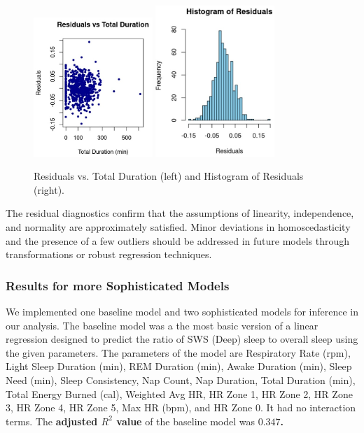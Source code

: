 \documentclass{article}
\begin{document}
\begin{figure}[h!]
  \centering
  \includegraphics[width=0.4\textwidth]{images/residuals_vs_duration.png}
  \includegraphics[width=0.4\textwidth]{images/histogram_residuals.png}
  \caption{Residuals vs. Total Duration (left) and Histogram of Residuals (right).}
  \label{fig:residuals-duration}
  \label{fig:hist-residuals}
\end{figure}

The residual diagnostics confirm that the assumptions of linearity, independence, and normality are approximately satisfied. Minor deviations in homoscedasticity and the presence of a few outliers should be addressed in future models through transformations or robust regression techniques.

\subsubsection{ \hspace{0.5em} Results for more Sophisticated Models}

We implemented one baseline model and two sophisticated models for inference in our analysis. The baseline model was a the most basic version of a linear regression designed to predict the ratio of SWS (Deep) sleep to overall sleep using the given parameters. The parameters of the model are Respiratory Rate (rpm), Light Sleep Duration (min), REM Duration (min), Awake Duration (min), Sleep Need (min), Sleep Consistency, Nap Count, Nap Duration, Total Duration (min), Total Energy Burned (cal), Weighted Avg HR, HR Zone 1, HR Zone 2, HR Zone 3, HR Zone 4, HR Zone 5, Max HR (bpm), and HR Zone 0. It had no interaction terms. The \textbf{adjusted $R^2$ value }of the baseline model was \textbf{$0.347$.} \\
\end{document}
